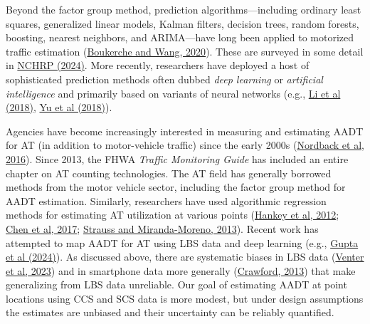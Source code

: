 \documentclass[11pt]{article}
\begin{document}
Beyond the factor group method, prediction algorithms---including
ordinary least squares, generalized linear models, Kalman filters,
decision trees, random forests, boosting, nearest neighbors, and
ARIMA---have long been applied to motorized traffic estimation
(\href{https://www.sciencedirect.com/science/article/abs/pii/S1389128620311877}{Boukerche
and Wang, 2020}). These are surveyed in some detail in
\href{https://nap.nationalacademies.org/catalog/27925/guide-on-methods-for-assigning-counts-to-adjustment-factor-groups}{NCHRP
(2024)}. More recently, researchers have deployed a host of
sophisticated prediction methods often dubbed \emph{deep learning} or
\emph{artificial intelligence} and primarily based on variants of neural
networks (e.g., \href{https://arxiv.org/pdf/1707.01926}{Li et al
(2018)}, \href{https://arxiv.org/pdf/1709.04875}{Yu et al (2018)}).

Agencies have become increasingly interested in measuring and estimating
AADT for AT (in addition to motor-vehicle traffic) since the early 2000s
(\href{https://www.oregon.gov/odot/Programs/ResearchDocuments/SPR772_Bicycle_PedestrianTechnologies.pdf}{Nordback
et al, 2016}). Since 2013, the FHWA \emph{Traffic Monitoring Guide} has
included an entire chapter on AT counting technologies. The AT field has
generally borrowed methods from the motor vehicle sector, including the
factor group method for AADT estimation. Similarly, researchers have
used algorithmic regression methods for estimating AT utilization at
various points
(\href{https://www.sciencedirect.com/science/article/abs/pii/S0169204612001910}{Hankey
et al, 2012};
\href{https://www.jtlu.org/index.php/jtlu/article/view/892}{Chen et al,
2017};
\href{https://www.jtlu.org/index.php/jtlu/article/view/296}{Strauss and
Miranda-Moreno, 2013}). Recent work has attempted to map AADT for AT
using LBS data and deep learning (e.g.,
\href{https://arxiv.org/abs/2410.08522}{Gupta et al (2024)}). As
discussed above, there are systematic biases in LBS data
(\href{https://www.sciencedirect.com/science/article/pii/S0169204623000051}{Venter
et al, 2023}) and in smartphone data more generally
(\href{https://hbr.org/2013/04/the-hidden-biases-in-big-data}{Crawford,
2013}) that make generalizing from LBS data unreliable. Our goal of
estimating AADT at point locations using CCS and SCS data is more
modest, but under design assumptions the estimates are unbiased and
their uncertainty can be reliably quantified.
\end{document}
